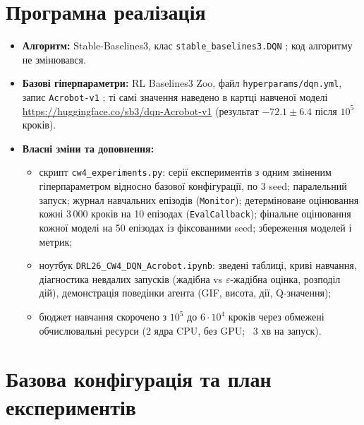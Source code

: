 \documentclass[11pt,a4paper]{article}
\newcommand{\code}[1]{\texttt{#1}}
\begin{document}
\section{Програмна реалізація}
\begin{itemize}
\item \textbf{Алгоритм:} Stable-Baselines3, клас \code{stable\_baselines3.DQN} \cite{sb3}; код алгоритму не змінювався.
\item \textbf{Базові гіперпараметри:} RL Baselines3 Zoo, файл \code{hyperparams/dqn.yml}, запис \code{Acrobot-v1} \cite{zoo}; ті самі значення наведено в картці навченої моделі \url{https://huggingface.co/sb3/dqn-Acrobot-v1} (результат $-72.1\pm6.4$ після $10^5$ кроків).
\item \textbf{Власні зміни та доповнення:}
  \begin{itemize}
  \item скрипт \code{cw4\_experiments.py}: серії експериментів з одним зміненим гіперпараметром відносно базової конфігурації, по 3 seed; паралельний запуск; журнал навчальних епізодів (\code{Monitor}); детерміноване оцінювання кожні 3\,000 кроків на 10 епізодах (\code{EvalCallback}); фінальне оцінювання кожної моделі на 50 епізодах із фіксованими seed; збереження моделей і метрик;
  \item ноутбук \code{DRL26\_CW4\_DQN\_Acrobot.ipynb}: зведені таблиці, криві навчання, діагностика невдалих запусків (жадібна vs $\varepsilon$-жадібна оцінка, розподіл дій), демонстрація поведінки агента (GIF, висота, дії, Q-значення);
  \item бюджет навчання скорочено з $10^5$ до $6\cdot10^4$ кроків через обмежені обчислювальні ресурси (2 ядра CPU, без GPU; ~3 хв на запуск).
  \end{itemize}
\end{itemize}

\section{Базова конфігурація та план експериментів}
\end{document}
